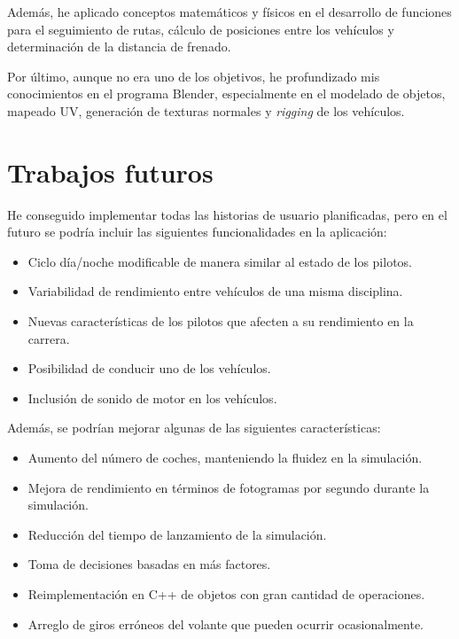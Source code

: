 \bigskip

Además, he aplicado conceptos matemáticos y físicos en el desarrollo de funciones para el seguimiento de rutas, cálculo de posiciones entre los vehículos y determinación de la distancia de frenado.

\bigskip

Por último, aunque no era uno de los objetivos, he profundizado mis conocimientos en el programa Blender, especialmente en el modelado de objetos, mapeado UV, generación de texturas normales y \textit{rigging} de los vehículos.  


\section{Trabajos futuros}

He conseguido implementar todas las historias de usuario planificadas, pero en el futuro se podría incluir las siguientes funcionalidades en la aplicación:

\begin{itemize}
    \item Ciclo día/noche modificable de manera similar al estado de los pilotos.
    \item Variabilidad de rendimiento entre vehículos de una misma disciplina.
    \item Nuevas características de los pilotos que afecten a su rendimiento en la carrera.
    \item Posibilidad de conducir uno de los vehículos.
    \item Inclusión de sonido de motor en los vehículos.
\end{itemize}

\bigskip

Además, se podrían mejorar algunas de las siguientes características:

\begin{itemize}
    \item Aumento del número de coches, manteniendo la fluidez en la simulación.
    \item Mejora de rendimiento en términos de fotogramas por segundo durante la simulación.
    \item Reducción del tiempo de lanzamiento de la simulación.
    \item Toma de decisiones basadas en más factores.
    \item Reimplementación en C++ de objetos con gran cantidad de operaciones.
    \item Arreglo de giros erróneos del volante que pueden ocurrir ocasionalmente.
\end{itemize}